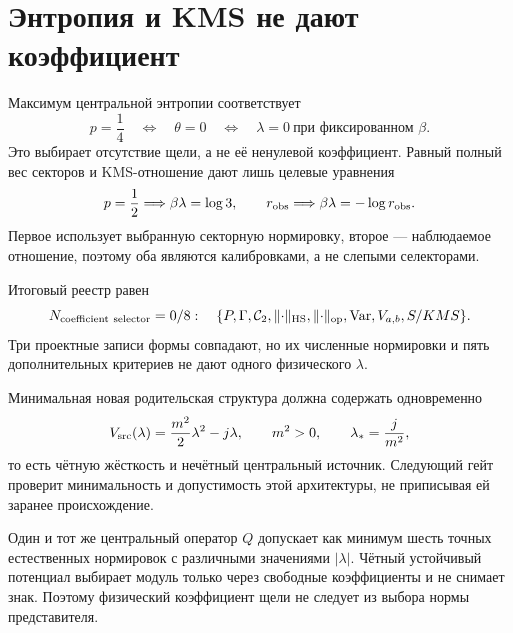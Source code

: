 \section{Энтропия и KMS не дают коэффициент}

Максимум центральной энтропии соответствует
\begin{equation}
 p=\frac14
 \quad\Longleftrightarrow\quad
 \theta=0
 \quad\Longleftrightarrow\quad
 \lambda=0\ \text{при фиксированном }\beta.
 \label{eq:v8-baryon-c0-central-gap-maximum-entropy-zero-gap}
\end{equation}
Это выбирает отсутствие щели, а не её ненулевой коэффициент. Равный полный
вес секторов и KMS-отношение дают лишь целевые уравнения
\begin{equation}
 p=\frac12\Longrightarrow\beta\lambda=\log3,
 \qquad
 r_{\rm obs}\Longrightarrow\beta\lambda=-\log r_{\rm obs}.
 \label{eq:v8-baryon-c0-central-gap-target-dependent-equations}
\end{equation}
Первое использует выбранную секторную нормировку, второе --- наблюдаемое
отношение, поэтому оба являются калибровками, а не слепыми селекторами.

Итоговый реестр равен
\begin{equation}
 N_{\rm coefficient\ selector}=0/8:
 \quad\{P,\Gamma,\mathcal C_2,\lVert\cdot\rVert_{\rm HS},
 \lVert\cdot\rVert_{\rm op},\operatorname{Var},V_{a,b},S/KMS\}.
 \label{eq:v8-baryon-c0-central-gap-coefficient-selector-ledger}
\end{equation}
Три проектные записи формы совпадают, но их численные нормировки и пять
дополнительных критериев не дают одного физического $\lambda$.

Минимальная новая родительская структура должна содержать одновременно
\begin{equation}
 V_{\rm src}(\lambda)=\frac{m^2}{2}\lambda^2-j\lambda,
 \qquad m^2>0,
 \qquad \lambda_*=\frac{j}{m^2},
 \label{eq:v8-baryon-c0-central-gap-minimal-source-preview}
\end{equation}
то есть чётную жёсткость и нечётный центральный источник. Следующий гейт
проверит минимальность и допустимость этой архитектуры, не приписывая ей
заранее происхождение.

\begin{theorem}
Один и тот же центральный оператор $Q$ допускает как минимум шесть точных
естественных нормировок с различными значениями $|\lambda|$. Чётный
устойчивый потенциал выбирает модуль только через свободные коэффициенты и
не снимает знак. Поэтому физический коэффициент щели не следует из выбора
нормы представителя.
\end{theorem}

